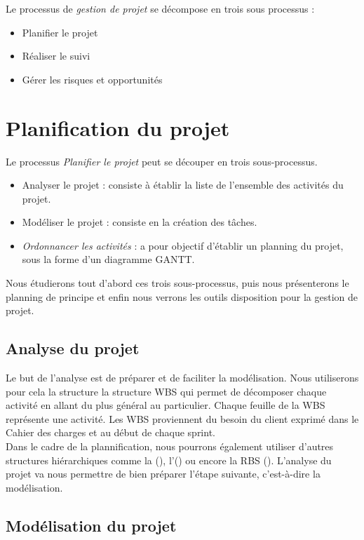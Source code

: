 Le processus de \textit{gestion de projet} se décompose en trois sous processus : 
\begin{itemize}
\item Planifier le projet
\item Réaliser le suivi
\item Gérer les risques et opportunités
\end{itemize}

\section{Planification du projet}

Le processus \textit{Planifier le projet} peut se découper en trois sous-processus.

\begin{itemize}
\item Analyser le projet : consiste à établir la liste de l'ensemble des activités du projet.
\item Modéliser le projet : consiste en la création des tâches.
\item \textit{Ordonnancer les activités} : a pour objectif d'établir un planning du projet, sous la forme d'un diagramme GANTT.
\end{itemize}

Nous étudierons tout d'abord ces trois sous-processus, puis nous présenterons le planning de principe et enfin nous verrons les outils  disposition pour la gestion de projet. 

\subsection{Analyse du projet}
Le but de l'analyse est de préparer et de faciliter la modélisation. Nous utiliserons pour cela la structure la structure WBS qui permet de décomposer chaque activité en allant du plus général au particulier. Chaque feuille de la WBS représente une activité. Les WBS proviennent du besoin du client exprimé dans le Cahier des charges et au début de chaque sprint. \\

Dans le cadre de la plannification, nous pourrons également utiliser d’autres structures hiérarchiques comme la \FBSCourt (\FBS), l’\OBSCourt (\OBS) ou encore la RBS (\RBS). L’analyse du projet va nous permettre de bien préparer l’étape suivante, c’est-à-dire la modélisation.


\subsection{Modélisation du projet}

